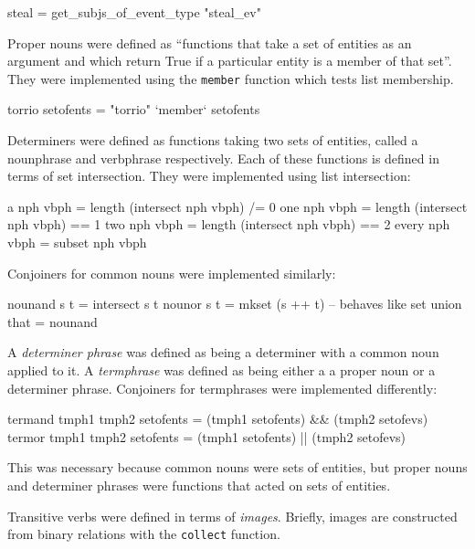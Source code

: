 \documentclass[../main.tex]{subfiles}
\begin{document}
\begin{code}
	steal = get_subjs_of_event_type "steal_ev"
\end{code}

Proper nouns were defined as ``functions that take a set of entities as an
argument and which return True if a particular entity is a member of that
set''\cite{frost2014denotational}.  They were implemented using the
\texttt{member} function which tests list membership.

\begin{code}
	torrio setofents  = "torrio" `member` setofents
\end{code}

Determiners were defined as functions taking two sets of entities, called
a nounphrase and verbphrase respectively.  Each of these functions
is defined in terms of set intersection.  They were implemented using
list intersection:

\begin{code}
  a     nph vbph     = length (intersect nph vbph) /= 0
  one   nph vbph     = length (intersect nph vbph)  == 1
  two   nph vbph     = length (intersect nph vbph)  == 2
  every nph vbph     = subset  nph vbph
\end{code}

Conjoiners for common nouns were implemented similarly:

\begin{code}
  nounand s t  = intersect s t
  nounor  s t  = mkset (s ++ t) -- behaves like set union
  that         = nounand
\end{code}


A {\em determiner phrase} was defined as being a determiner with a common noun applied to it\cite{frost2014denotational}.
A {\em termphrase} was defined as being either a a proper noun or a determiner phrase\cite{frost2014denotational}.
Conjoiners for termphrases were implemented differently:
\vspace{1em}
\begin{code}
 termand tmph1 tmph2 setofents = (tmph1 setofents) && (tmph2 setofevs)
 termor  tmph1 tmph2 setofents = (tmph1 setofents) || (tmph2 setofevs)
\end{code}
\vspace{1em}
This was necessary because common nouns were sets of entities, but
proper nouns and determiner phrases were functions that acted on sets
of entities.

Transitive verbs were defined in terms of {\em images}\cite{frost2014denotational}.  Briefly, images
are constructed from binary relations with the \texttt{collect} function.
\end{document}
